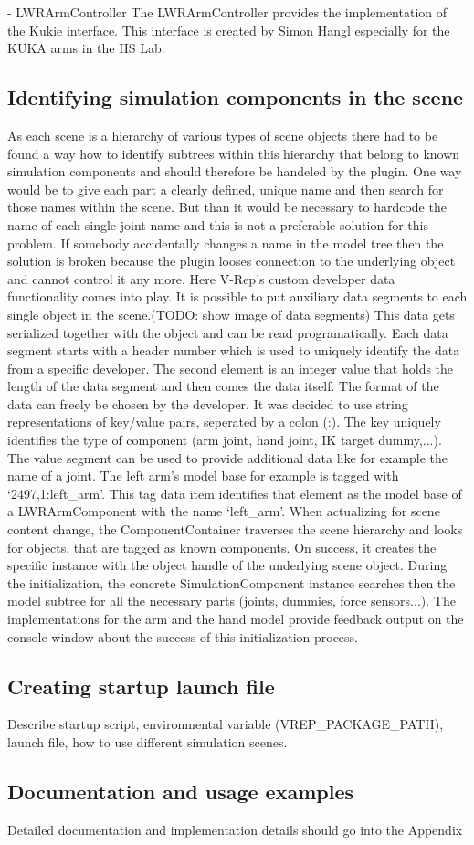 - LWRArmController
  The LWRArmController provides the implementation of the Kukie interface. This interface is created
  by Simon Hangl especially for the KUKA arms in the IIS Lab.
  
\subsection{Identifying simulation components in the scene}

As each scene is a hierarchy of various types of scene objects there had to be found a way how to identify subtrees within this hierarchy that belong to known simulation components and should therefore be handeled by the plugin. One way would be to give each part a clearly defined, unique name and then search for those names within the scene. But than it would be necessary to hardcode the name of each single joint name and this is not a preferable solution for this problem. If somebody accidentally changes a name in the model tree then the solution is broken because the plugin looses connection to the underlying object and cannot control it any more. Here V-Rep's custom developer data functionality comes into play. It is possible to put auxiliary data segments to each single object in the scene.(TODO: show image of data segments) This data gets serialized together with the object and can be read programatically. Each data segment starts with a header number which is used to uniquely identify the data from a specific developer. The second element is an integer value that holds the length of the data segment and then comes the data itself. The format of the data can freely be chosen by the developer. It was decided to use string representations of key/value pairs, seperated by a colon (:). The key uniquely identifies the type of component (arm joint, hand joint, IK target dummy,...). The value segment can be used to provide additional data like for example the name of a joint. The left arm's model base for example is tagged with `2497,1:left\_arm'. This tag data item identifies that element as the model base of a LWRArmComponent with the name `left\_arm'. When actualizing for scene content change, the ComponentContainer traverses the scene hierarchy and looks for objects, that are tagged as known components. On success, it creates the specific instance with the object handle of the underlying scene object. During the initialization, the concrete SimulationComponent instance searches then the model subtree for all the necessary parts (joints, dummies, force sensors...). The implementations for the arm and the hand model provide feedback output on the console window about the success of this initialization process.

\subsection{Creating startup launch file}

Describe startup script, environmental variable (VREP\_PACKAGE\_PATH), launch file, how to use different simulation scenes.

\subsection{Documentation and usage examples}
Detailed documentation and implementation details should go into the Appendix

